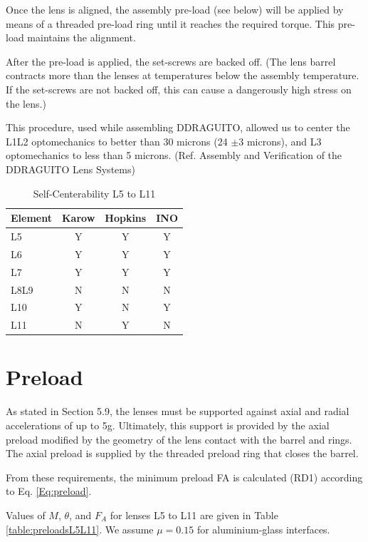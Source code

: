 \documentclass{report}
\begin{document}
Once the lens is aligned, the assembly pre-load (see below) will be applied by means of a threaded pre-load ring until it reaches the required torque. This pre-load maintains the alignment.

After the pre-load is applied, the set-screws are backed off. (The lens barrel contracts more than the lenses at temperatures below the assembly temperature. If the set-screws are not backed off, this can cause a dangerously high stress on the lens.)

This procedure, used while assembling DDRAGUITO, allowed us to center the L1L2 optomechanics to better than 30 microns (24 $\pm 3$ microns), and L3 optomechanics to less than 5 microns. (Ref. Assembly and Verification of the DDRAGUITO Lens Systems)

\begin{table}
\caption{Self-Centerability L5 to L11}
\label{table:self-centerabilityL5L11}
\begin{center}
\small
\begin{tabular}{lccc}
\hline
\hline
Element&Karow&Hopkins&INO\\
\hline
L5&Y&Y&Y\\
L6&Y&Y&Y\\
L7&Y&Y&Y\\
L8L9&N&N&N\\
L10&Y&N&Y\\
L11&N&Y&N\\
\hline
\end{tabular}
\end{center}
\end{table}

\section{Preload}
 
As stated in Section 5.9, the lenses must be supported against axial and radial accelerations of up to 5g. Ultimately, this support is provided by the axial preload modified by the geometry of the lens contact with the barrel and rings. The axial preload is supplied by the threaded preload ring that closes the barrel.

From these requirements, the minimum preload FA is calculated (RD1) according to Eq. \eqref{Eq:preload}.

Values of $M$, $\theta$, and $F_A$ for lenses L5 to L11 are given in Table \ref{table:preloadsL5L11}. 
We assume $\mu = 0.15$ for aluminium-glass interfaces.
\end{document}

